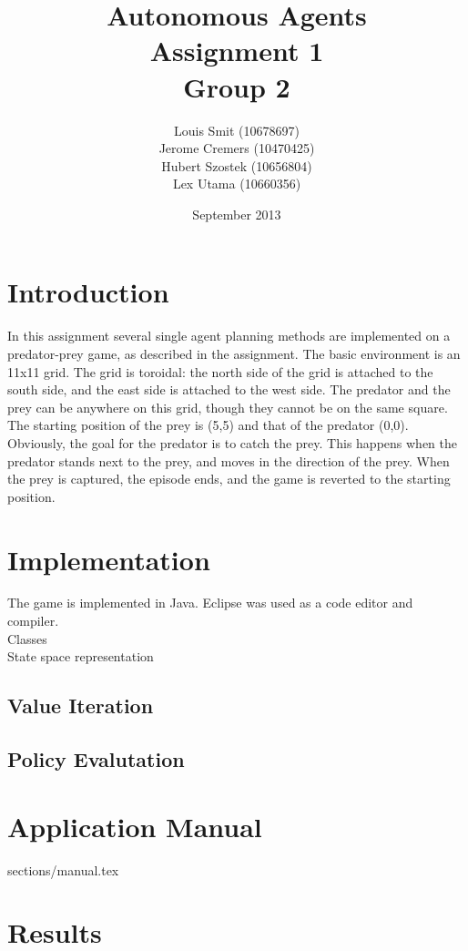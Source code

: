 \documentclass{article}
\title{Autonomous Agents \\ Assignment 1 \\ Group 2}
\author{Louis Smit (10678697) \\ Jerome Cremers (10470425) \\
Hubert Szostek (10656804) \\ Lex Utama (10660356)}
\date{September 2013}
\begin{document}
\maketitle 

\section{Introduction}
In this assignment several single agent planning methods are implemented on a predator-prey game, as described in the assignment. The basic environment is an 11x11 grid. The grid is
toroidal: the north side of the grid is attached to the south side, and the east side is attached to the west side. The predator and the prey can be anywhere on this grid, though they cannot be on the same square. The starting position of the prey is (5,5) and that of the predator (0,0).\\
Obviously, the goal for the predator is to catch the prey. This happens when the predator stands next to the prey, and moves in the direction of the prey. When the prey is captured, the episode ends, and the game is reverted to the starting position.


\section{Implementation}
The game is implemented in Java. Eclipse was used as a code editor and compiler. \\
Classes\\
State space representation\\

\subsection{Value Iteration}


\subsection{Policy Evalutation}



\section{Application Manual}
 {sections/manual.tex}

\section{Results}
\label{sec:results}
\end{document}
